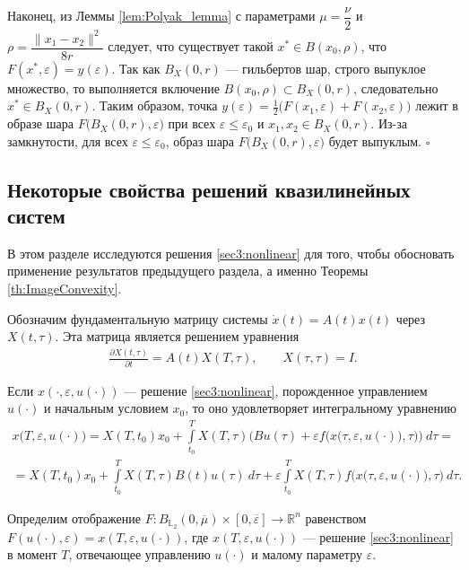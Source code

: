 \documentclass[../main.tex]{subfiles}
\begin{document}
Наконец, из Леммы \ref{lem:Polyak_lemma} с параметрами $\mu=\dfrac{\nu}{2}$ и $\rho=\dfrac{\|x_1-x_2\|^2}{8r}$ следует, что существует такой $x^*\in B(x_0, \rho)$, что $F(x^*,\varepsilon) = y(\varepsilon)$.
Так как $B_X(0, r)$ --- гильбертов шар, строго выпуклое множество, то выполняется включение $B(x_0, \rho) \subset B_X(0, r)$, следовательно $x^* \in B_X(0, r)$. 
Таким образом, точка $y(\varepsilon) = \frac{1}{2} \big( F(x_1,\varepsilon) + F(x_2,\varepsilon)\big)$ лежит в образе шара $F\big(B_X(0,r),\varepsilon\big) $ при всех $\varepsilon \leqslant \varepsilon_0$ и $x_1, x_2 \in B_X(0,r)$. 
Из-за замкнутости, для всех $\varepsilon \leqslant \varepsilon_0$, образ шара $F\big(B_X(0,r),\varepsilon\big) $ будет выпуклым.
\hfill$\square$\\[1ex]%

\subsection{Некоторые свойства решений квазилинейных систем}


В этом разделе исследуются решения \eqref{sec3:nonlinear} для того, чтобы обосновать применение результатов предыдущего раздела, а именно Теоремы \ref{th:ImageConvexity}. 

Обозначим фундаментальную матрицу системы $\dot{x}(t) = A(t) x(t)$ через $X(t,\tau)$.
Эта матрица является решением уравнения
\begin{gather*}
 \frac{\partial X(t,\tau)}{\partial t} = A(t) X(T,\tau), \qquad X(\tau,\tau) = I.
\end{gather*}

Если $x(\cdot,\varepsilon, u(\cdot))$ --- решение \eqref{sec3:nonlinear}, порожденное управлением $u(\cdot)$ и начальным условием $x_0$, то оно удовлетворяет интегральному уравнению
\begin{gather*}
 x\big(T,\varepsilon, u(\cdot)\big) =
 X(T,t_0)x_0 + 
 \int\limits_{t_0}^T X(T,\tau) \bigg(Bu(\tau) +
 \varepsilon f\Big(x\big(\tau,\varepsilon, u(\cdot)\big),\tau\Big) \bigg)\ d\tau = \\ =
 X(T,t_0)x_0 +
 \int\limits_{t_0}^T X(T,\tau) B(t)u(\tau)\ d\tau 
 + \varepsilon \int\limits_{t_0}^T X(T,\tau) f\Big(x\big(\tau,\varepsilon, u(\cdot)\big),\tau\Big) \ d\tau.
\end{gather*}

Определим отображение $F:B_{\mathbb{L}_2}(0,\overline{\mu})\times [0,\overline{\varepsilon}] \to \mathbb{R}^n$ равенством $F(u(\cdot),\varepsilon) = x(T,\varepsilon,u(\cdot))$, где $x(T,\varepsilon,u(\cdot))$ --- решение \eqref{sec3:nonlinear} в момент $T$, отвечающее управлению $u(\cdot)$ и малому параметру $\varepsilon$.
\end{document}

